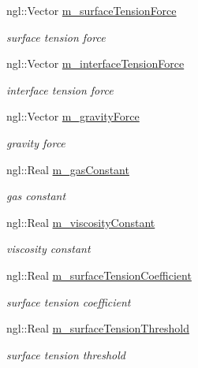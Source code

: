 \begin{DoxyCompactItemize}
ngl::Vector \hyperlink{class_fluid_particle_ac2bbf04b2f814d332ed7dc5113472471}{m\_\-surfaceTensionForce}
\begin{DoxyCompactList}\small\item\em surface tension force \item\end{DoxyCompactList}\item 
ngl::Vector \hyperlink{class_fluid_particle_a1eed81ac818dc7d027490e912aa880c8}{m\_\-interfaceTensionForce}
\begin{DoxyCompactList}\small\item\em interface tension force \item\end{DoxyCompactList}\item 
ngl::Vector \hyperlink{class_fluid_particle_a4759c4e1e0729283a71dec834b753ae1}{m\_\-gravityForce}
\begin{DoxyCompactList}\small\item\em gravity force \item\end{DoxyCompactList}\item 
ngl::Real \hyperlink{class_fluid_particle_a19ddab3f4dfe30378c11d3afa11a4708}{m\_\-gasConstant}
\begin{DoxyCompactList}\small\item\em gas constant \item\end{DoxyCompactList}\item 
ngl::Real \hyperlink{class_fluid_particle_a3788ca2bcafe18bf8bbf59faa0146385}{m\_\-viscosityConstant}
\begin{DoxyCompactList}\small\item\em viscosity constant \item\end{DoxyCompactList}\item 
ngl::Real \hyperlink{class_fluid_particle_a9b07a93d8ec041692c3ad99319c08939}{m\_\-surfaceTensionCoefficient}
\begin{DoxyCompactList}\small\item\em surface tension coefficient \item\end{DoxyCompactList}\item 
ngl::Real \hyperlink{class_fluid_particle_aaa03e2d5786c38929e8e0546c08e950c}{m\_\-surfaceTensionThreshold}
\begin{DoxyCompactList}\small\item\em surface tension threshold \item\end{DoxyCompactList}\item 

\end{DoxyCompactItemize}
